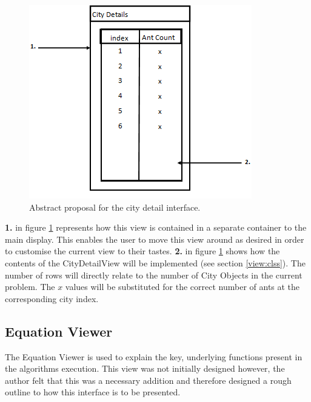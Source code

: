 \begin{figure}[H]
\centering
\includegraphics[scale=0.7]{Images/chapter4/citydetails}
\caption{Abstract proposal for the city detail interface.}
\label{fig:deetzViewImp}
\end{figure}

\textbf{1.} in figure \ref{fig:deetzViewImp} represents how this view is contained in a separate container to the main display. This enables the user to move this view around as desired in order to customise the current view to their tastes. \textbf{2.} in figure \ref{fig:deetzViewImp} shows how the contents of the CityDetailView will be implemented (see section \ref{view:clss}). The number of rows will directly relate to the number of City Objects in the current problem. The $x$ values will be substituted for the correct number of ants at the corresponding city index.

\subsection{Equation Viewer}
\label{eqnlview}

The Equation Viewer is used to explain the key, underlying functions present in the algorithms execution. This view was not initially designed however, the author felt that this was a necessary addition and therefore designed a rough outline to how this interface is to be presented.

